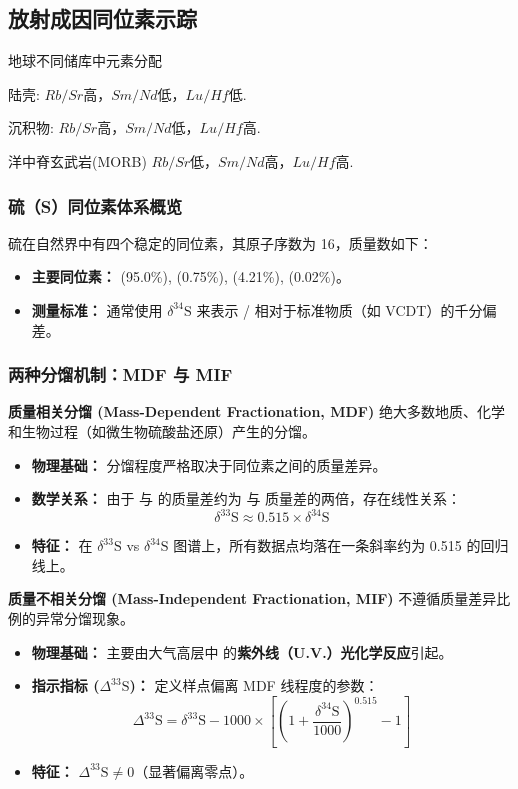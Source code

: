 \documentclass[12pt,a4paper]{article}
\begin{document}
	\subsection{放射成因同位素示踪}
	地球不同储库中元素分配
	
	陆壳: $Rb/Sr$高，$Sm/Nd$低，$Lu/Hf$低.
	
	沉积物: $Rb/Sr$高，$Sm/Nd$低，$Lu/Hf$高.
	
	洋中脊玄武岩(MORB) $Rb/Sr$低，$Sm/Nd$高，$Lu/Hf$高.
	
	\subsubsection{硫（S）同位素体系概览}
	硫在自然界中有四个稳定的同位素，其原子序数为 16，质量数如下：
	\begin{itemize}
		\item \textbf{主要同位素：}  (95.0\%),  (0.75\%),  (4.21\%),  (0.02\%)。
		\item \textbf{测量标准：} 通常使用 $\delta^{34}\text{S}$ 来表示 / 相对于标准物质（如 VCDT）的千分偏差。
	\end{itemize}
	
	\subsubsection{两种分馏机制：MDF 与 MIF}
	
	\textbf{质量相关分馏 (Mass-Dependent Fractionation, MDF)}
	绝大多数地质、化学和生物过程（如微生物硫酸盐还原）产生的分馏。
	\begin{itemize}
		\item \textbf{物理基础：} 分馏程度严格取决于同位素之间的质量差异。
		\item \textbf{数学关系：} 由于  与  的质量差约为  与  质量差的两倍，存在线性关系：
		\begin{equation}
			\delta^{33}\text{S} \approx 0.515 \times \delta^{34}\text{S}
		\end{equation}
		\item \textbf{特征：} 在 $\delta^{33}\text{S}$ vs $\delta^{34}\text{S}$ 图谱上，所有数据点均落在一条斜率约为 0.515 的回归线上。
	\end{itemize}
	
	\textbf{质量不相关分馏 (Mass-Independent Fractionation, MIF)}
	不遵循质量差异比例的异常分馏现象。
	\begin{itemize}
		\item \textbf{物理基础：} 主要由大气高层中  的\textbf{紫外线（U.V.）光化学反应}引起。
		\item \textbf{指示指标 ($\Delta^{33}\text{S}$)：} 定义样点偏离 MDF 线程度的参数：
		\begin{equation}
			\Delta^{33}\text{S} = \delta^{33}\text{S} - 1000 \times \left[ \left( 1 + \frac{\delta^{34}\text{S}}{1000} \right)^{0.515} - 1 \right]
		\end{equation}
		\item \textbf{特征：} $\Delta^{33}\text{S} \neq 0$（显著偏离零点）。
	\end{itemize}
	
\end{document}
